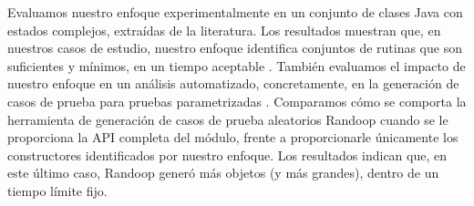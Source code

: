 





Evaluamos nuestro enfoque experimentalmente en un conjunto de clases Java con estados complejos, extraídas de la literatura. Los resultados muestran que, en nuestros casos de estudio, nuestro enfoque identifica conjuntos de rutinas que son suficientes y mínimos, en un tiempo aceptable . También evaluamos el impacto de nuestro enfoque en un análisis automatizado, concretamente, en la generación de casos de prueba para pruebas parametrizadas . Comparamos cómo se comporta la herramienta de generación de casos de prueba aleatorios Randoop cuando se le proporciona la API completa del módulo, frente a proporcionarle únicamente los constructores identificados por nuestro enfoque. Los resultados indican que, en este último caso, Randoop generó más objetos (y más grandes), dentro de un tiempo límite fijo.











